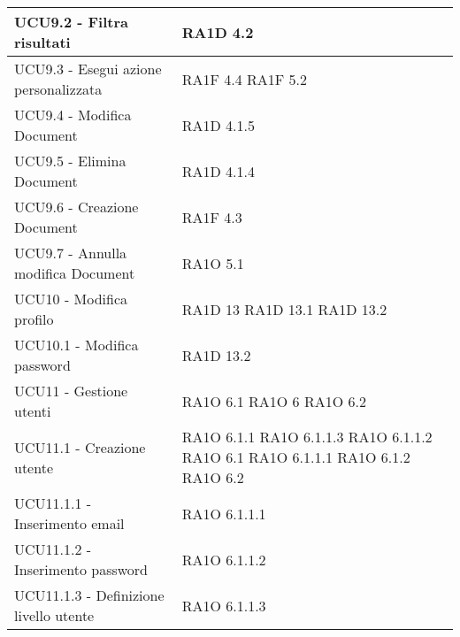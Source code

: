 \begin{center}
\begin{longtable}{ | p{5cm} | p{5cm} |}
            UCU9.2 - Filtra risultati &  RA1D 4.2  \newline  \\ \hline      
            UCU9.3 - Esegui azione personalizzata &  RA1F 4.4 \newline  RA1F 5.2 \newline  \\ \hline      
            UCU9.4 - Modifica Document &  RA1D 4.1.5 \newline  \\ \hline      
            UCU9.5 - Elimina Document &  RA1D 4.1.4  \newline  \\ \hline      
            UCU9.6 - Creazione Document &  RA1F 4.3 \newline  \\ \hline      
            UCU9.7 - Annulla modifica Document &  RA1O 5.1 \newline  \\ \hline      
            UCU10 - Modifica profilo &  RA1D 13 \newline  RA1D 13.1 \newline  RA1D 13.2 \newline  \\ \hline      
            UCU10.1 - Modifica password &  RA1D 13.2 \newline  \\ \hline      
            UCU11 - Gestione utenti &  RA1O 6.1  \newline  RA1O 6 \newline  RA1O 6.2  \newline  \\ \hline      
            UCU11.1 - Creazione utente &  RA1O 6.1.1  \newline  RA1O 6.1.1.3  \newline  RA1O 6.1.1.2 \newline  RA1O 6.1  \newline  RA1O 6.1.1.1  \newline  RA1O 6.1.2  \newline  RA1O 6.2  \newline  \\ \hline      
            UCU11.1.1 - Inserimento email &  RA1O 6.1.1.1  \newline  \\ \hline      
            UCU11.1.2 - Inserimento password &  RA1O 6.1.1.2 \newline  \\ \hline      
            UCU11.1.3 - Definizione livello utente &  RA1O 6.1.1.3  \newline  \\ \hline      

\end{longtable}
\end{center}
